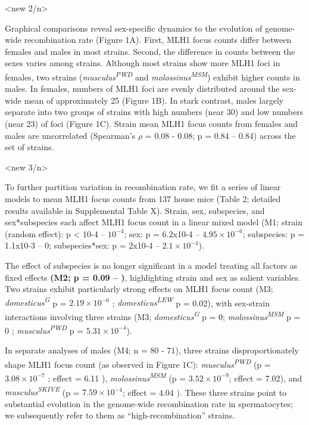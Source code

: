 \documentclass[
]{article}
\begin{document}
\textless new 2/n\textgreater{}

Graphical comparisons reveal sex-specific dynamics to the evolution of
genome-wide recombination rate (Figure 1A). First, MLH1 focus counts
differ between females and males in most strains. Second, the difference
in counts between the sexes varies among strains. Although most strains
show more MLH1 foci in females, two strains
(\emph{musculus\textsuperscript{PWD}} and
\emph{molossinus\textsuperscript{MSM}}) exhibit higher counts in males.
In females, numbers of MLH1 foci are evenly distributed around the
sex-wide mean of approximately 25 (Figure 1B). In stark contrast, males
largely separate into two groups of strains with high numbers (near 30)
and low numbers (near 23) of foci (Figure 1C). Strain mean MLH1 focus
counts from females and males are uncorrelated (Spearman's \(\rho\) =
0.08 - 0.08; p = 0.84 -- 0.84) across the set of strains.

\textless new 3/n\textgreater{}

To further partition variation in recombination rate, we fit a series of
linear models to mean MLH1 focus counts from 137 house mice (Table 2;
detailed results available in Supplemental Table X). Strain, sex,
subspecies, and sex*subspecies each affect MLH1 focus count in a linear
mixed model (M1; strain (random effect): p \textless{} 10-4 --
\ensuremath{10^{-4}}; sex: p = 6.2x10-4 --
\ensuremath{4.95\times 10^{-6}}; subspecies: p = 1.1x10-3 -- 0;
subspecies*sex: p = 2x10-4 -- \ensuremath{2.1\times 10^{-4}}).

The effect of subspecies is no longer significant in a model treating
all factors as fixed effects \textbf{(M2; p = 0.09 -- )}, highlighting
strain and sex as salient variables. Two strains exhibit particularly
strong effects on MLH1 focus count (M3;
\emph{domesticus\textsuperscript{G}} p = \ensuremath{2.19\times 10^{-6}}
; \emph{domesticus\textsuperscript{LEW}} p = 0.02), with sex-strain
interactions involving three strains (M3;
\emph{domesticus\textsuperscript{G}} p = 0;
\emph{molossinus\textsuperscript{MSM}} p = 0 ;
\emph{musculus\textsuperscript{PWD}} p =
\ensuremath{5.31\times 10^{-4}}).

In separate analyses of males (M4; n = 80 - 71), three strains
disproportionately shape MLH1 focus count (as observed in Figure 1C):
\emph{musculus\textsuperscript{PWD}} (p =
\ensuremath{3.08\times 10^{-7}} ; effect = 6.11 ),
\emph{molossinus\textsuperscript{MSM}} (p =
\ensuremath{3.52\times 10^{-9}}; effect = 7.02), and
\emph{musculus\textsuperscript{SKIVE}} (p =
\ensuremath{7.59\times 10^{-4}}; effect = 4.04 ). These three strains
point to substantial evolution in the genome-wide recombination rate in
spermatocytes; we subsequently refer to them as ``high-recombination''
strains.
\end{document}
